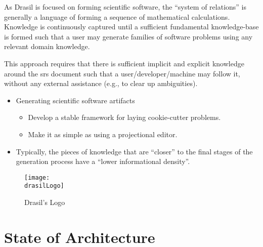 As Drasil is focused on forming scientific software, the ``system of relations''
is generally a language of forming a sequence of mathematical calculations.
Knowledge is continuously captured until a sufficient fundamental knowledge-base
is formed such that a user may generate families of software problems using any
relevant domain knowledge.

This approach requires that there is sufficient implicit and explicit knowledge
around the \acs{srs} document such that a user/developer/machine may follow it,
without any external assistance (e.g., to clear up ambiguities).


\begin{itemize}

      \item Generating scientific software artifacts
            \begin{itemize}

                  \item Develop a stable framework for laying cookie-cutter
                        problems.

                  \item Make it as simple as using a projectional editor.

            \end{itemize}

      \item Typically, the pieces of knowledge that are ``closer'' to the final
            stages of the generation process have a ``lower informational
            density''.

\end{itemize}

\begin{figure}[H]
      \centering
      \caption{Drasil's Logo}
      \label{fig:drasilLogo}
      \texttt{[image: \\drasilLogo]}
\end{figure}

\drasilPersonification

\section{State of Architecture}

